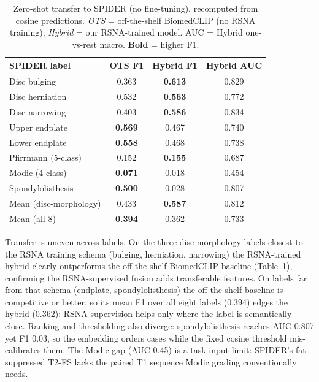 \documentclass[runningheads]{llncs}
\newcommand{\best}[1]{\textcolor{best}{\textbf{#1}}}
\begin{document}
\begin{table}[t]
\centering
\caption{Zero-shot transfer to SPIDER (no fine-tuning), recomputed from cosine predictions. \emph{OTS} = off-the-shelf BiomedCLIP (no RSNA training); \emph{Hybrid} = our RSNA-trained model. AUC = Hybrid one-vs-rest macro. \textbf{Bold} = higher F1.}
\label{tab:spider}
\begin{tabular}{@{}lccc@{}}
\toprule
SPIDER label              & OTS F1 & Hybrid F1 & Hybrid AUC \\
\midrule
Disc bulging              & 0.363 & \best{0.613} & 0.829 \\
Disc herniation           & 0.532 & \best{0.563} & 0.772 \\
Disc narrowing            & 0.403 & \best{0.586} & 0.834 \\
\midrule
Upper endplate            & \best{0.569} & 0.467 & 0.740 \\
Lower endplate            & \best{0.558} & 0.468 & 0.738 \\
Pfirrmann (5-class)       & 0.152 & \best{0.155} & 0.687 \\
Modic (4-class)           & \best{0.071} & 0.018 & 0.454 \\
Spondylolisthesis         & \best{0.500} & 0.028 & 0.807 \\
\midrule
Mean (disc-morphology)    & 0.433 & \best{0.587} & 0.812 \\
Mean (all 8)              & \best{0.394} & 0.362 & 0.733 \\
\bottomrule
\end{tabular}
\end{table}

Transfer is uneven across labels. On the three disc-morphology labels closest to the RSNA training schema (bulging, herniation, narrowing) the RSNA-trained hybrid clearly outperforms the off-the-shelf BiomedCLIP baseline (Table~\ref{tab:spider}), confirming the RSNA-supervised fusion adds transferable features. On labels far from that schema (endplate, spondylolisthesis) the off-the-shelf baseline is competitive or better, so its mean F1 over all eight labels (0.394) edges the hybrid (0.362): RSNA supervision helps only where the label is semantically close. Ranking and thresholding also diverge: spondylolisthesis reaches AUC 0.807 yet F1 0.03, so the embedding orders cases while the fixed cosine threshold mis-calibrates them. The Modic gap (AUC 0.45) is a task-input limit: SPIDER's fat-suppressed T2-FS lacks the paired T1 sequence Modic grading conventionally needs.
\end{document}
